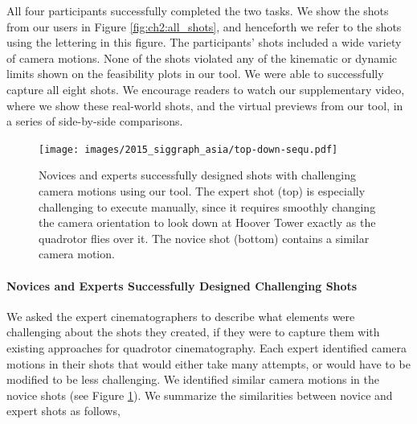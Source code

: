 All four participants successfully completed the two tasks.
We show the shots from our users in Figure \ref{fig:ch2:all_shots}, and henceforth we refer to the shots using the lettering in this figure.
The participants' shots included a wide variety of camera motions.
None of the shots violated any of the kinematic or dynamic limits shown on the feasibility plots in our tool.
We were able to successfully capture all eight shots.
We encourage readers to watch our supplementary video, where we show these real-world shots, and the virtual previews from our tool, in a series of side-by-side comparisons.

\begin{figure}[t]
\centering
\texttt{[image: images/2015\_siggraph\_asia/top-down-sequ.pdf]}
\caption{
Novices and experts successfully designed shots with challenging camera motions using our tool.
The expert shot (top) is especially challenging to execute manually, since it requires smoothly changing the camera orientation to look down at Hoover Tower exactly as the quadrotor flies over it.
The novice shot (bottom) contains a similar camera motion.
}
\label{fig:ch2:expert_novice_comparison}
\end{figure}

\paragraph{Novices and Experts Successfully Designed Challenging Shots}
We asked the expert cinematographers to describe what elements were challenging about the shots they created, if they were to capture them with existing approaches for quadrotor cinematography.
Each expert identified camera motions in their shots that would either take many attempts, or would have to be modified to be less challenging.
We identified similar camera motions in the novice shots (see Figure \ref{fig:ch2:expert_novice_comparison}).
We summarize the similarities between novice and expert shots as follows,

